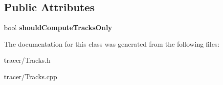 \subsection*{Public Attributes}
\begin{DoxyCompactItemize}
\item 
\mbox{\label{class_tracks_a66cb4ec9a2db84d0abecb7ea327dffdd}} 
bool {\bfseries should\+Compute\+Tracks\+Only}
\end{DoxyCompactItemize}


The documentation for this class was generated from the following files\+:\begin{DoxyCompactItemize}
\item 
tracer/Tracks.\+h\item 
tracer/Tracks.\+cpp\end{DoxyCompactItemize}
